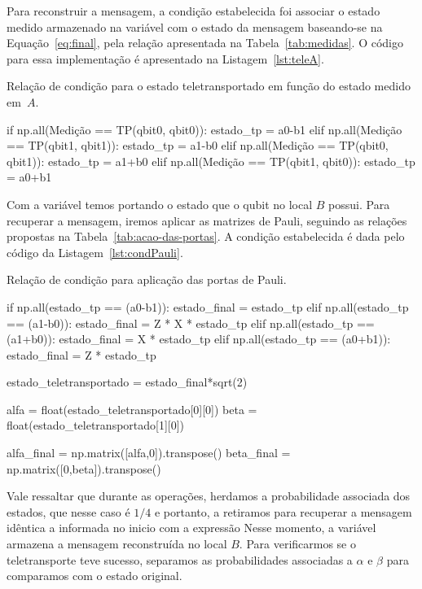 Para reconstruir a mensagem, a condição estabelecida foi associar o estado medido armazenado na variável  com o estado da mensagem baseando-se na Equação~\eqref{eq:final}, pela relação apresentada na Tabela~\ref{tab:medidas}. O código para essa implementação é apresentado na Listagem~\ref{lst:teleA}.

\begin{listing}[ht!]
  \caption{Relação de condição para o estado teletransportado em função do estado medido em~\(A\).}\label{lst:teleA}
  \begin{pycode}
      if np.all(Medição == TP(qbit0, qbit0)):
          estado_tp = a0-b1
      elif np.all(Medição == TP(qbit1, qbit1)):
          estado_tp = a1-b0
      elif np.all(Medição == TP(qbit0, qbit1)):
          estado_tp = a1+b0
      elif np.all(Medição == TP(qbit1, qbit0)):
          estado_tp = a0+b1
  \end{pycode}
\end{listing}

Com a variável  temos portando o estado que o qubit no local \(B\) possui. Para recuperar a mensagem, iremos aplicar as matrizes de Pauli, seguindo as relações propostas na Tabela~\ref{tab:acao-das-portas}. A condição estabelecida é dada pelo código da Listagem~\ref{lst:condPauli}.

\begin{listing}[ht!]
  \caption{Relação de condição para aplicação das portas de Pauli.}\label{lst:condPauli}
  \begin{pycode}
      if np.all(estado_tp == (a0-b1)):
          estado_final = estado_tp
      elif np.all(estado_tp == (a1-b0)):
          estado_final = Z * X * estado_tp
      elif np.all(estado_tp == (a1+b0)):
          estado_final = X * estado_tp
      elif np.all(estado_tp == (a0+b1)):
          estado_final = Z * estado_tp
    
      estado_teletransportado = estado_final*sqrt(2)

      alfa = float(estado_teletransportado[0][0])
      beta = float(estado_teletransportado[1][0])

      alfa_final = np.matrix([alfa,0]).transpose()
      beta_final = np.matrix([0,beta]).transpose()
  \end{pycode}
\end{listing}

Vale ressaltar que durante as operações, herdamos a probabilidade associada dos estados, que nesse caso é $1/4$ e portanto, a retiramos para recuperar a mensagem idêntica a informada no inicio com a expressão Nesse momento, a variável  armazena a mensagem reconstruída no local \(B\). Para verificarmos se o teletransporte teve sucesso, separamos as probabilidades associadas a $\alpha$ e $\beta$ para comparamos com o estado original.

